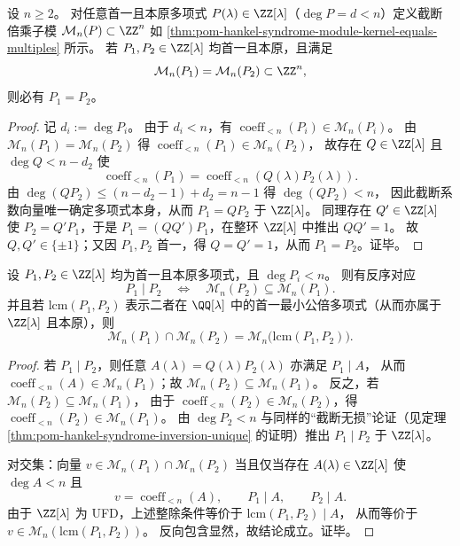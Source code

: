 \begin{theorem}[综合征子格对最小递推的反演唯一性]\label{thm:pom-hankel-syndrome-inversion-unique}
设 \(n\ge 2\)。
对任意首一且本原多项式 \(P(\lambda)\in\ZZ[\lambda]\)（\(\deg P=d<n\)）定义截断倍乘子模 \(\mathcal M_n(P)\subset\ZZ^n\) 如 \eqref{thm:pom-hankel-syndrome-module-kernel-equals-multiples} 所示。
若 \(P_1,P_2\in\ZZ[\lambda]\) 均首一且本原，且满足
\[
\mathcal M_n(P_1)=\mathcal M_n(P_2)\subset\ZZ^n,
\]
则必有 \(P_1=P_2\)。
\end{theorem}
\begin{proof}
记 \(d_i:=\deg P_i\)。
由于 \(d_i<n\)，有 \(\operatorname{coeff}_{<n}(P_i)\in \mathcal M_n(P_i)\)。
由 \(\mathcal M_n(P_1)=\mathcal M_n(P_2)\) 得 \(\operatorname{coeff}_{<n}(P_1)\in \mathcal M_n(P_2)\)，
故存在 \(Q\in\ZZ[\lambda]\) 且 \(\deg Q<n-d_2\) 使
\[
\operatorname{coeff}_{<n}(P_1)=\operatorname{coeff}_{<n}(Q(\lambda)P_2(\lambda)).
\]
由 \(\deg(QP_2)\le (n-d_2-1)+d_2=n-1\) 得 \(\deg(QP_2)<n\)，
因此截断系数向量唯一确定多项式本身，从而 \(P_1=QP_2\) 于 \(\ZZ[\lambda]\)。
同理存在 \(Q'\in\ZZ[\lambda]\) 使 \(P_2=Q'P_1\)，于是 \(P_1=(QQ')P_1\)，在整环 \(\ZZ[\lambda]\) 中推出 \(QQ'=1\)。
故 \(Q,Q'\in\{\pm 1\}\)；又因 \(P_1,P_2\) 首一，得 \(Q=Q'=1\)，从而 \(P_1=P_2\)。证毕。
\end{proof}

\begin{proposition}\label{prop:pom-hankel-syndrome-divisibility-reversal-lcm}
设 \(P_1,P_2\in\ZZ[\lambda]\) 均为首一且本原多项式，且 \(\deg P_i<n\)。
则有反序对应
\[
P_1\mid P_2
\quad\Longleftrightarrow\quad
\mathcal M_n(P_2)\subseteq \mathcal M_n(P_1).
\]
并且若 \(\mathrm{lcm}(P_1,P_2)\) 表示二者在 \(\QQ[\lambda]\) 中的首一最小公倍多项式（从而亦属于 \(\ZZ[\lambda]\) 且本原），则
\[
\mathcal M_n(P_1)\cap \mathcal M_n(P_2)=\mathcal M_n\bigl(\mathrm{lcm}(P_1,P_2)\bigr).
\]
\end{proposition}
\begin{proof}
若 \(P_1\mid P_2\)，则任意 \(A(\lambda)=Q(\lambda)P_2(\lambda)\) 亦满足 \(P_1\mid A\)，
从而 \(\operatorname{coeff}_{<n}(A)\in\mathcal M_n(P_1)\)；故 \(\mathcal M_n(P_2)\subseteq\mathcal M_n(P_1)\)。
反之，若 \(\mathcal M_n(P_2)\subseteq\mathcal M_n(P_1)\)，
由于 \(\operatorname{coeff}_{<n}(P_2)\in\mathcal M_n(P_2)\)，得 \(\operatorname{coeff}_{<n}(P_2)\in\mathcal M_n(P_1)\)。
由 \(\deg P_2<n\) 与同样的“截断无损”论证（见定理 \ref{thm:pom-hankel-syndrome-inversion-unique} 的证明）推出 \(P_1\mid P_2\) 于 \(\ZZ[\lambda]\)。
\par
对交集：向量 \(v\in\mathcal M_n(P_1)\cap\mathcal M_n(P_2)\) 当且仅当存在 \(A(\lambda)\in\ZZ[\lambda]\) 使 \(\deg A<n\) 且
\[
v=\operatorname{coeff}_{<n}(A),\qquad P_1\mid A,\qquad P_2\mid A.
\]
由于 \(\ZZ[\lambda]\) 为 UFD，上述整除条件等价于 \(\mathrm{lcm}(P_1,P_2)\mid A\)，
从而等价于 \(v\in\mathcal M_n(\mathrm{lcm}(P_1,P_2))\)。
反向包含显然，故结论成立。证毕。
\end{proof}

